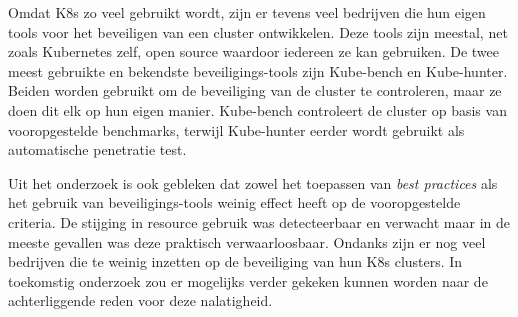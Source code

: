 Omdat K8s zo veel gebruikt wordt, zijn er tevens veel bedrijven die hun eigen tools voor het beveiligen van een cluster ontwikkelen. Deze tools zijn meestal, net zoals Kubernetes zelf, open source waardoor iedereen ze kan gebruiken. De twee meest gebruikte en bekendste beveiligings-tools zijn Kube-bench en Kube-hunter. Beiden worden gebruikt om de beveiliging van de cluster te controleren, maar ze doen dit elk op hun eigen manier. Kube-bench controleert de cluster op basis van vooropgestelde benchmarks, terwijl Kube-hunter eerder wordt gebruikt als automatische penetratie test.

Uit het onderzoek is ook gebleken dat zowel het toepassen van \textit{best practices} als het gebruik van beveiligings-tools weinig effect heeft op de vooropgestelde criteria. De stijging in resource gebruik was detecteerbaar en verwacht maar in de meeste gevallen was deze praktisch verwaarloosbaar. Ondanks zijn er nog veel bedrijven die te weinig inzetten op de beveiliging van hun K8s clusters. In toekomstig onderzoek zou er mogelijks verder gekeken kunnen worden naar de achterliggende reden voor deze nalatigheid.  